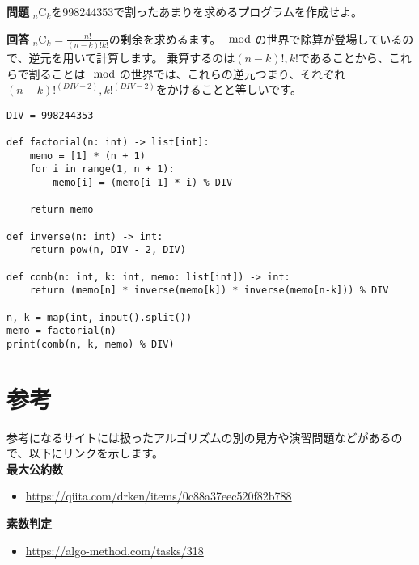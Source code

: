\documentclass{jlreq}
\begin{document}
  \begin{tcolorbox}[enhanced,
    colback=white!85!gray,
    drop fuzzy shadow,
    boxrule=0.3mm,
    arc=0mm,
    left=0pt,
    top=0pt,
    sharp corners,
    width=\textwidth,
    ]
    \textbf{問題}
    ${}_n \mathrm{C}_k$を998244353で割ったあまりを求めるプログラムを作成せよ。
  \tcblower

  \begin{tcolorbox}[
    coltext=white!10!blue,
    colback=white!90!purple!90!blue,
    drop fuzzy shadow,
    boxrule=0mm,
    arc=0mm,
    width=1.3cm,
    left=0pt,
    right=0pt,
    top=0pt,
    bottom=0pt,
    halign=flush left,
  ]
  \end{tcolorbox}
  \tcblower
  \textbf{回答} 
  ${}_n \mathrm{C}_k = \frac{n!}{(n - k)! k!}$の剰余を求めるます。$\mod$の世界で除算が登場しているので、逆元を用いて計算します。
  乗算するのは$(n - k)!, k!$であることから、これらで割ることは$\mod$の世界では、これらの逆元つまり、それぞれ$(n - k)!^{(DIV-2)}, k!^{(DIV-2)}$をかけることと等しいです。
  \begin{lstlisting}[caption=${}_n \mathrm{C}_k$を求める, label=combination]
DIV = 998244353

def factorial(n: int) -> list[int]:
    memo = [1] * (n + 1)
    for i in range(1, n + 1):
        memo[i] = (memo[i-1] * i) % DIV
    
    return memo

def inverse(n: int) -> int:
    return pow(n, DIV - 2, DIV)

def comb(n: int, k: int, memo: list[int]) -> int:
    return (memo[n] * inverse(memo[k]) * inverse(memo[n-k])) % DIV
 
n, k = map(int, input().split())
memo = factorial(n)
print(comb(n, k, memo) % DIV)
  \end{lstlisting}
  \end{tcolorbox}%

\section{参考}
参考になるサイトには扱ったアルゴリズムの別の見方や演習問題などがあるので、以下にリンクを示します。\\
\textbf{最大公約数}
\begin{itemize}
    \item \url{https://qiita.com/drken/items/0c88a37eec520f82b788}
\end{itemize}


\textbf{素数判定}

\begin{itemize}
    \item \url{https://algo-method.com/tasks/318}
\end{itemize}
\end{document}
